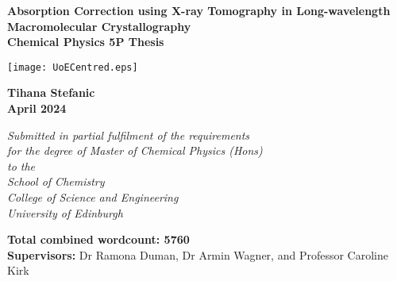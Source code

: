 
\thispagestyle{empty}
\par\noindent                                           %

\begin{singlespace}
	\vspace{1cm}
	\begin{center}
		\Huge\bf\sc Absorption Correction using X-ray Tomography in Long-wavelength Macromolecular Crystallography \\
		\vspace{2mm}
		\large\bf Chemical Physics 5P Thesis
	\end{center}
	\vspace{1cm}
	\begin{center}
		\texttt{[image: UoECentred.eps]}
	\end{center}
	\vspace{1.8cm}
	\begin{center}
		\bf\Large Tihana Stefanic\\                 %
		April 2024                         %
	\end{center}
	
	\begin{center}
		\small\itshape
		Submitted in partial fulfilment of the requirements \\  for the degree of Master of Chemical Physics (Hons) \\
		to the \\
		School of Chemistry \\
		College of Science and Engineering \\
		University of Edinburgh
	\end{center}
	
	
	\vspace*{5mm}   

	
	\vspace*{3cm}
	
	
	\vfill
	{\bf Total combined wordcount: 5760} \\
	{\bf Supervisors:} Dr Ramona Duman, Dr Armin Wagner, and Professor Caroline Kirk              %
\end{singlespace}

\newpage
\footruleheight{1pt}
\headruleheight{1pt}
\rhead{\thepage}
\cfoot{}

